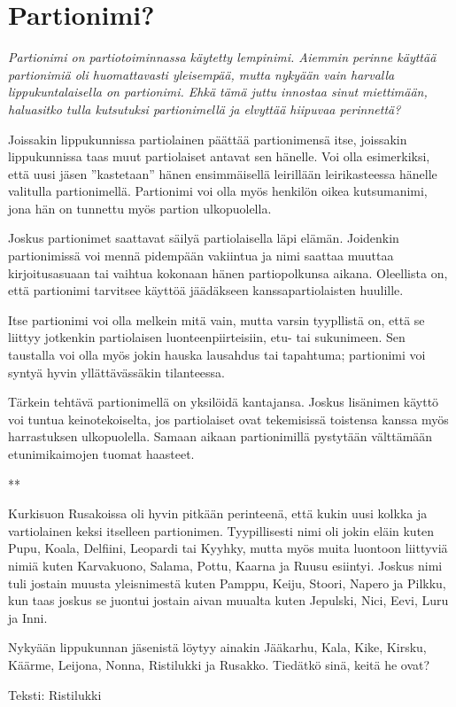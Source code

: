 \section{Partionimi?}

\textit{Partionimi on partiotoiminnassa käytetty lempinimi. Aiemmin perinne 
käyttää partionimiä oli huomattavasti yleisempää, mutta nykyään vain 
harvalla lippukuntalaisella on partionimi. Ehkä tämä juttu innostaa sinut 
miettimään, haluasitko tulla kutsutuksi partionimellä ja elvyttää hiipuvaa 
perinnettä?}

\begin{multicols}{2}
\noindent Joissakin lippukunnissa partiolainen päättää partionimensä itse, 
joissakin lippukunnissa taas muut partiolaiset antavat sen hänelle. Voi olla 
esimerkiksi, että uusi jäsen ''kastetaan'' hänen ensimmäisellä 
leirillään leirikasteessa hänelle valitulla partionimellä. Partionimi voi 
olla myös henkilön oikea kutsumanimi, jona hän on tunnettu myös partion 
ulkopuolella.

Joskus partionimet saattavat säilyä partiolaisella läpi elämän. Joidenkin 
partionimissä voi mennä pidempään vakiintua ja nimi saattaa muuttaa 
kirjoitusasuaan tai vaihtua kokonaan hänen partiopolkunsa aikana. Oleellista 
on, että partionimi tarvitsee käyttöä jäädäkseen kanssapartiolaisten 
huulille.

Itse partionimi voi olla melkein mitä vain, mutta varsin tyypllistä on, että 
se liittyy jotkenkin partiolaisen luonteenpiirteisiin, etu- tai sukunimeen. Sen 
taustalla voi olla myös jokin hauska lausahdus tai tapahtuma; partionimi voi 
syntyä hyvin yllättävässäkin tilanteessa.

Tärkein tehtävä partionimellä on yksilöidä kantajansa. Joskus lisänimen 
käyttö voi tuntua keinotekoiselta, jos partiolaiset ovat tekemisissä 
toistensa kanssa myös harrastuksen ulkopuolella. Samaan aikaan partionimillä 
pystytään välttämään etunimikaimojen tuomat haasteet.

{\smallskip\noindent\centering ***\par\smallskip}

Kurkisuon Rusakoissa oli hyvin pitkään perinteenä, että kukin uusi kolkka 
ja vartiolainen keksi itselleen partionimen. Tyypillisesti nimi oli jokin 
eläin kuten Pupu, Koala, Delfiini, Leopardi tai Kyyhky, mutta myös muita 
luontoon liittyviä nimiä kuten Karvakuono, Salama, Pottu, Kaarna ja Ruusu 
esiintyi. Joskus nimi tuli jostain muusta yleisnimestä kuten Pamppu, Keiju, 
Stoori, Napero ja Pilkku, kun taas joskus se juontui jostain aivan muualta 
kuten Jepulski, Nici, Eevi, Luru ja Inni. 

Nykyään lippukunnan jäsenistä löytyy ainakin Jääkarhu, Kala, Kike, 
Kirsku, Käärme, Leijona, Nonna, Ristilukki ja Rusakko. Tiedätkö sinä, 
keitä he ovat?
\end{multicols}

\vfill

\noindent\null\hfill Teksti: Ristilukki
